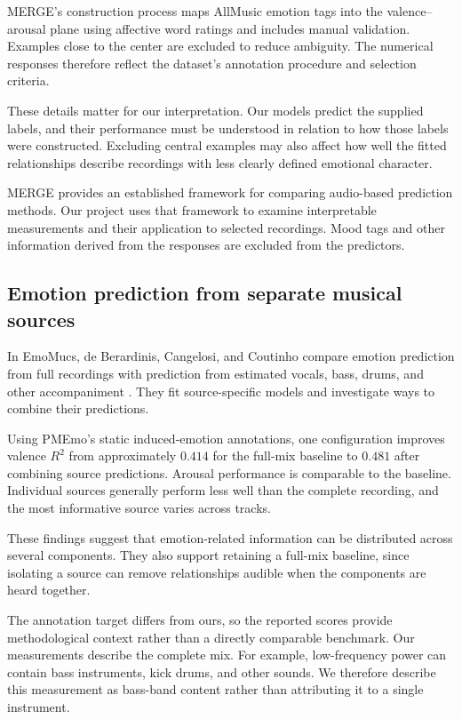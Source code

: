MERGE's construction process maps AllMusic emotion tags into the valence--arousal plane using affective word ratings and includes manual validation. Examples close to the center are excluded to reduce ambiguity. The numerical responses therefore reflect the dataset's annotation procedure and selection criteria.

These details matter for our interpretation. Our models predict the supplied labels, and their performance must be understood in relation to how those labels were constructed. Excluding central examples may also affect how well the fitted relationships describe recordings with less clearly defined emotional character.

MERGE provides an established framework for comparing audio-based prediction methods. Our project uses that framework to examine interpretable measurements and their application to selected recordings. Mood tags and other information derived from the responses are excluded from the predictors.

\subsection{Emotion prediction from separate musical sources}

In EmoMucs, de Berardinis, Cangelosi, and Coutinho compare emotion prediction from full recordings with prediction from estimated vocals, bass, drums, and other accompaniment \cite[Secs.~3--4]{deberardinis2020emomucs}. They fit source-specific models and investigate ways to combine their predictions.

Using PMEmo's static induced-emotion annotations, one configuration improves valence $R^2$ from approximately $0.414$ for the full-mix baseline to $0.481$ after combining source predictions. Arousal performance is comparable to the baseline. Individual sources generally perform less well than the complete recording, and the most informative source varies across tracks.

These findings suggest that emotion-related information can be distributed across several components. They also support retaining a full-mix baseline, since isolating a source can remove relationships audible when the components are heard together.

The annotation target differs from ours, so the reported scores provide methodological context rather than a directly comparable benchmark. Our measurements describe the complete mix. For example, low-frequency power can contain bass instruments, kick drums, and other sounds. We therefore describe this measurement as bass-band content rather than attributing it to a single instrument.

